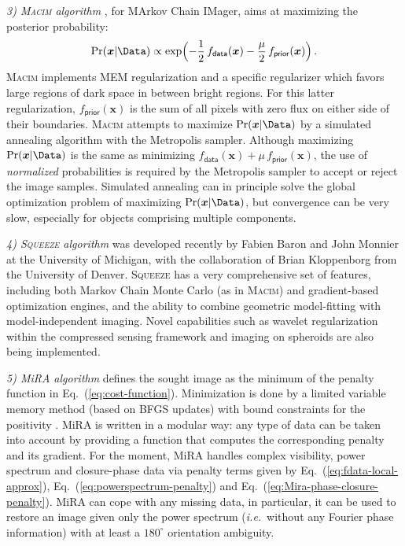 \documentclass{article}
\newcommand{\Tag}[1]{\mathsf{#1}}        %
\newcommand{\V}[1]{\boldsymbol{#1}}      %
\newcommand{\ie}{\textit{i.e.}\xspace}
\newcommand{\Eq}[1]{Eq.~(\ref{#1})}
\newcommand{\Param}{x}
\newcommand{\VParam}{\V{\Param}}
\newcommand{\DataTag}{\Tag{data}}
\newcommand{\PriorTag}{\Tag{prior}}
\newcommand{\Fcost}{f}
\newcommand{\Fdata}{\Fcost_\DataTag}
\newcommand{\Fprior}{\Fcost_\PriorTag}
\newcommand{\Mira}{MiRA\xspace}
\newcommand{\Macim}{\textsc{Macim}\xspace}
\newcommand{\Squeeze}{\textsc{Squeeze}\xspace}
\begin{document}
\textit{3) \Macim algorithm} \citep{Ireland_et_al-2006-MACIM}, for MArkov Chain
IMager, aims at maximizing the posterior probability:
\begin{displaymath}
  \Pr(\VParam\vert\Data)\propto
  \exp\Bigl(-\frac{1}{2}\,\Fdata(\VParam)
  - \frac{\mu}{2}\,\Fprior(\VParam)\Bigr) \,.
\end{displaymath}
\Macim implements MEM regularization and a specific regularizer which favors
large regions of dark space in between bright regions.  For this latter
regularization, $\Fprior(\VParam)$ is the sum of all pixels with zero flux on
either side of their boundaries.  \Macim attempts to maximize
$\Pr(\VParam\vert\Data)$ by a simulated annealing algorithm with the
Metropolis sampler.  Although maximizing $\Pr(\VParam\vert\Data)$ is the same
as minimizing $\Fdata(\VParam)+\mu\,\Fprior(\VParam)$, the use of
\emph{normalized} probabilities is required by the Metropolis sampler to
accept or reject the image samples. Simulated annealing can in principle solve
the global optimization problem of maximizing $\Pr(\VParam\vert\Data)$, but
convergence can be very slow, especially for objects comprising multiple
components.

\textit{4) \Squeeze algorithm} \citep{Baron_et_al-2010-SQUEEZE} was developed
recently by Fabien Baron and John Monnier at the University of Michigan, with
the collaboration of Brian Kloppenborg from the University of Denver. \Squeeze
has a very comprehensive set of features, including both Markov Chain Monte
Carlo (as in \Macim) and gradient-based optimization engines, and the ability
to combine geometric model-fitting with model-independent imaging. Novel
capabilities such as wavelet regularization within the compressed sensing
framework and imaging on spheroids are also being implemented.

\textit{5) \Mira algorithm} \citep{Thiebaut-2008-Marseille} defines the sought
image as the minimum of the penalty function in \Eq{eq:cost-function}.
Minimization is done by a limited variable memory method (based on BFGS
updates) with bound constraints for the positivity
\citep{Thiebaut:spie2002:bdec}.  \Mira is written in a modular way: any type
of data can be taken into account by providing a function that computes the
corresponding penalty and its gradient.  For the moment, \Mira handles complex
visibility, power spectrum and closure-phase data via penalty terms given by
\Eq{eq:fdata-local-approx}, \Eq{eq:powerspectrum-penalty} and
\Eq{eq:Mira-phase-closure-penalty}. \Mira can cope with any missing data, in
particular, it can be used to restore an image given only the power spectrum
(\ie\ without any Fourier phase information) with at least a $180^\circ$
orientation ambiguity.
\end{document}
